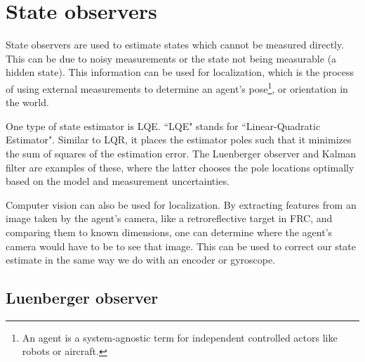 \section{State observers}

State \glspl{observer} are used to estimate \glspl{state} which cannot be
measured directly. This can be due to noisy measurements or the \gls{state} not
being measurable (a hidden \gls{state}). This information can be used for
\gls{localization}, which is the process of using external measurements to
determine an \gls{agent}'s pose\footnote{An agent is a system-agnostic term for
independent controlled actors like robots or aircraft.}, or orientation in the
world.

One type of \gls{state} estimator is LQE. ``LQE" stands for ``Linear-Quadratic
Estimator". Similar to LQR, it places the estimator poles such that it minimizes
the sum of squares of the estimation \gls{error}. The Luenberger \gls{observer}
and Kalman filter are examples of these, where the latter chooses the pole
locations optimally based on the \gls{model} and measurement uncertainties.

Computer vision can also be used for \gls{localization}. By extracting features
from an image taken by the \gls{agent}'s camera, like a retroreflective target
in FRC, and comparing them to known dimensions, one can determine where the
\gls{agent}'s camera would have to be to see that image. This can be used to
correct our \gls{state} estimate in the same way we do with an encoder or
gyroscope.

\subsection{Luenberger observer}

